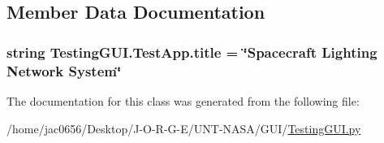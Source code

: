 \subsection{Member Data Documentation}
\subsubsection[{\texorpdfstring{title}{title}}]{\setlength{\rightskip}{0pt plus 5cm}string Testing\+G\+U\+I.\+Test\+App.\+title = \char`\"{}Spacecraft Lighting Network System\char`\"{}\hspace{0.3cm}{\ttfamily [static]}}\hypertarget{classTestingGUI_1_1TestApp_a8ed3f749511e756286c7216e71665c65}{}\label{classTestingGUI_1_1TestApp_a8ed3f749511e756286c7216e71665c65}


The documentation for this class was generated from the following file\+:\begin{DoxyCompactItemize}
\item 
/home/jac0656/\+Desktop/\+J-\/\+O-\/\+R-\/\+G-\/\+E/\+U\+N\+T-\/\+N\+A\+S\+A/\+G\+U\+I/\hyperlink{GUI_2TestingGUI_8py}{Testing\+G\+U\+I.\+py}\end{DoxyCompactItemize}
